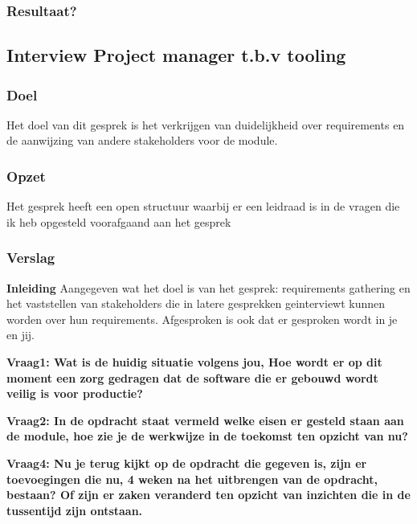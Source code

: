 \lipsum[07]

\subsubsection{Resultaat?}

\subsection{Interview Project manager t.b.v tooling}

\subsubsection{Doel}
Het doel van dit gesprek is het verkrijgen van duidelijkheid over requirements en de aanwijzing van andere stakeholders voor de module.

\subsubsection{Opzet}
Het gesprek heeft een open structuur waarbij er een leidraad is in de vragen die ik heb opgesteld voorafgaand aan het gesprek

\subsubsection{Verslag}
\textbf{Inleiding}
Aangegeven wat het doel is van het gesprek: requirements gathering en het vaststellen van stakeholders die in latere gesprekken geinterviewt kunnen worden over hun requirements. Afgesproken is ook dat er gesproken wordt in je en jij.

\bigskip

\textbf{Vraag1: Wat is de huidig situatie volgens jou, Hoe wordt er op dit moment een zorg gedragen dat de software die er gebouwd wordt veilig is voor productie?}

\lipsum[01]
\bigskip

\textbf{Vraag2: In de opdracht staat vermeld welke eisen er gesteld staan aan de module, hoe zie je de werkwijze in de toekomst ten opzicht van nu?}

\lipsum[03]
\bigskip

\textbf{Vraag4: Nu je terug kijkt op de opdracht die gegeven is, zijn er toevoegingen die nu, 4 weken na het uitbrengen van de opdracht, bestaan? Of zijn er zaken veranderd ten opzicht van inzichten die in de tussentijd zijn ontstaan.}

\lipsum[05]
\bigskip

